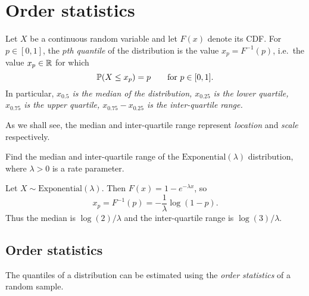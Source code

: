 
\section{Order statistics}\label{sec:orderstats}

\begin{definition}
Let $X$ be a continuous random variable and let $F(x)$ denote its CDF. For $p\in[0,1]$, the \emph{$p$th quantile} of the distribution is the value $x_p = F^{-1}(p)$, i.e.\ the value $x_p\in\mathbb{R}$ for which
\[
\mathbb{P}(X\leq x_p) = p \qquad\text{for $p\in[0,1]$.}
\]
In particular, 
\bit
\it $x_{0.5}$ is the \emph{median} of the distribution,
\it $x_{0.25}$ is the \emph{lower quartile},
\it $x_{0.75}$ is the \emph{upper quartile},
\it $x_{0.75}-x_{0.25}$ is the \emph{inter-quartile range}.
\eit
\end{definition}

\begin{remark}
As we shall see, the median and inter-quartile range represent \emph{location} and \emph{scale} respectively.
\end{remark}

\begin{example}
Find the median and inter-quartile range of the $\text{Exponential}(\lambda)$ distribution, where $\lambda>0$ is a rate parameter. 
\begin{solution}
Let $X\sim\text{Exponential}(\lambda)$. Then $F(x) = 1 - e^{-\lambda x}$, so
\[
x_p = F^{-1}(p) = -\frac{1}{\lambda}\log(1-p).
\]
Thus the median is $\log(2)/\lambda$ and the inter-quartile range is $\log(3)/\lambda$.
\end{solution}
\end{example}

\subsection{Order statistics}
The quantiles of a distribution can be estimated using the \emph{order statistics} of a random sample.


